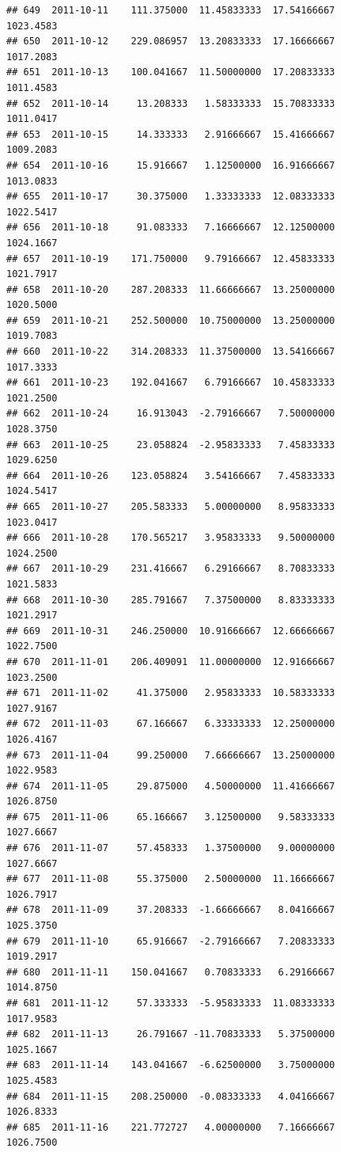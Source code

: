 \documentclass[
]{article}
\begin{document}
\begin{verbatim}
## 649  2011-10-11    111.375000  11.45833333  17.54166667    1023.4583
## 650  2011-10-12    229.086957  13.20833333  17.16666667    1017.2083
## 651  2011-10-13    100.041667  11.50000000  17.20833333    1011.4583
## 652  2011-10-14     13.208333   1.58333333  15.70833333    1011.0417
## 653  2011-10-15     14.333333   2.91666667  15.41666667    1009.2083
## 654  2011-10-16     15.916667   1.12500000  16.91666667    1013.0833
## 655  2011-10-17     30.375000   1.33333333  12.08333333    1022.5417
## 656  2011-10-18     91.083333   7.16666667  12.12500000    1024.1667
## 657  2011-10-19    171.750000   9.79166667  12.45833333    1021.7917
## 658  2011-10-20    287.208333  11.66666667  13.25000000    1020.5000
## 659  2011-10-21    252.500000  10.75000000  13.25000000    1019.7083
## 660  2011-10-22    314.208333  11.37500000  13.54166667    1017.3333
## 661  2011-10-23    192.041667   6.79166667  10.45833333    1021.2500
## 662  2011-10-24     16.913043  -2.79166667   7.50000000    1028.3750
## 663  2011-10-25     23.058824  -2.95833333   7.45833333    1029.6250
## 664  2011-10-26    123.058824   3.54166667   7.45833333    1024.5417
## 665  2011-10-27    205.583333   5.00000000   8.95833333    1023.0417
## 666  2011-10-28    170.565217   3.95833333   9.50000000    1024.2500
## 667  2011-10-29    231.416667   6.29166667   8.70833333    1021.5833
## 668  2011-10-30    285.791667   7.37500000   8.83333333    1021.2917
## 669  2011-10-31    246.250000  10.91666667  12.66666667    1022.7500
## 670  2011-11-01    206.409091  11.00000000  12.91666667    1023.2500
## 671  2011-11-02     41.375000   2.95833333  10.58333333    1027.9167
## 672  2011-11-03     67.166667   6.33333333  12.25000000    1026.4167
## 673  2011-11-04     99.250000   7.66666667  13.25000000    1022.9583
## 674  2011-11-05     29.875000   4.50000000  11.41666667    1026.8750
## 675  2011-11-06     65.166667   3.12500000   9.58333333    1027.6667
## 676  2011-11-07     57.458333   1.37500000   9.00000000    1027.6667
## 677  2011-11-08     55.375000   2.50000000  11.16666667    1026.7917
## 678  2011-11-09     37.208333  -1.66666667   8.04166667    1025.3750
## 679  2011-11-10     65.916667  -2.79166667   7.20833333    1019.2917
## 680  2011-11-11    150.041667   0.70833333   6.29166667    1014.8750
## 681  2011-11-12     57.333333  -5.95833333  11.08333333    1017.9583
## 682  2011-11-13     26.791667 -11.70833333   5.37500000    1025.1667
## 683  2011-11-14    143.041667  -6.62500000   3.75000000    1025.4583
## 684  2011-11-15    208.250000  -0.08333333   4.04166667    1026.8333
## 685  2011-11-16    221.772727   4.00000000   7.16666667    1026.7500

\end{verbatim}
\end{document}
